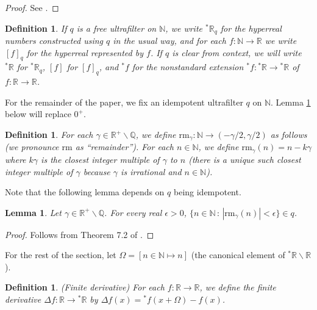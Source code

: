\documentclass[microtype]{jloganal}
\newtheorem{lemma}[theorem]{Lemma}
\newtheorem{definition}[theorem]{Definition}
\def\RM{\mathrm{rm}}
\begin{document}
\begin{proof}
    See \cite{hindman2011algebra}.
\end{proof}

\begin{definition}
\label{definitionofhyperrealsfromN}
    If $q$ is a free ultrafilter on $\mathbb N$, we write ${}^*\mathbb R_q$
    for the hyperreal numbers constructed using $q$ in the usual way, and
    for each $f:\mathbb N\to\mathbb R$ we write $[f]_q$ for the hyperreal
    represented by $f$.
    If $q$ is clear from context, we will write
    ${}^*\mathbb R$ for ${}^*\mathbb R_q$, $[f]$ for $[f]_q$,
    and ${}^*f$ for the nonstandard extension ${}^*f:{}^*\mathbb R\to{}^*\mathbb R$
    of $f:\mathbb R\to\mathbb R$.
\end{definition}

For the remainder of the paper, we fix an idempotent ultrafilter $q$ on $\mathbb N$.
Lemma \ref{bergelsonlemma} below will replace $0^+$.

\begin{definition}
\label{remainderdefn}
    For each $\gamma\in\mathbb R^+\backslash\mathbb Q$, we define
    $\RM_\gamma:\mathbb N\to (-\gamma/2,\gamma/2)$ as follows
    (we pronounce $\RM$ as ``remainder'').
    For each $n\in\mathbb N$, we define $\RM_\gamma(n)=n-k\gamma$ where
    $k\gamma$ is the closest integer multiple of $\gamma$ to $n$ (there is
    a unique such closest integer multiple of $\gamma$ because $\gamma$
    is irrational and $n\in\mathbb N$).
\end{definition}

Note that the following lemma depends on $q$ being idempotent.

\begin{lemma}
\label{bergelsonlemma}
    Let $\gamma\in\mathbb R^+\backslash \mathbb Q$.
    For every real $\epsilon>0$,
    $\{n\in\mathbb N\,:\,|\RM_\gamma(n)|<\epsilon\}\in q$.
\end{lemma}

\begin{proof}
    Follows from Theorem 7.2 of \cite{bergelson2010ultrafilters}.
\end{proof}

For the rest of the section, let $\Omega=[n\in\mathbb N\mapsto n]$ (the canonical
element of ${}^*\mathbb R\backslash \mathbb R$).

\begin{definition}
\label{finitederivdefn}
    (Finite derivative)
    For each $f:\mathbb R\to\mathbb R$, we define
    the finite derivative $\Delta f:\mathbb R\to{}^*\mathbb R$ by
    $\Delta f(x)={}^*f(x+\Omega)-f(x)$.
\end{definition}
\end{document}
